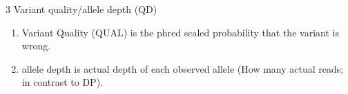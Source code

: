 \documentclass[t,10pt]{beamer}
\begin{document}
\begin{frame}[label={sec:orgheadline10}]{3 Variant quality/allele depth (QD)}
\begin{enumerate}
\item Variant Quality (QUAL) is the phred scaled probability that the variant is wrong.
\item allele depth is actual depth of each observed allele (How many actual reads; in contrast to \alert{DP}).
\end{enumerate}
\end{frame}
\end{document}
